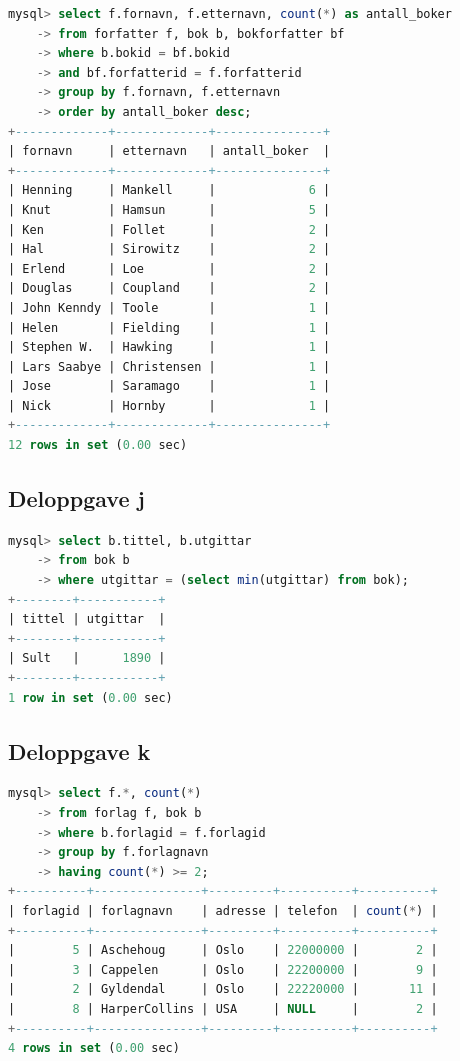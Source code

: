 \documentclass[a4paper, 12pt] {article}
\begin{document}
\begin{lstlisting}[language=SQL, label=oppg3i, caption=Oppgave 3i]
mysql> select f.fornavn, f.etternavn, count(*) as antall_boker
    -> from forfatter f, bok b, bokforfatter bf
    -> where b.bokid = bf.bokid
    -> and bf.forfatterid = f.forfatterid
    -> group by f.fornavn, f.etternavn
    -> order by antall_boker desc;
+-------------+-------------+---------------+
| fornavn     | etternavn   | antall_boker  |
+-------------+-------------+---------------+
| Henning     | Mankell     |             6 |
| Knut        | Hamsun      |             5 |
| Ken         | Follet      |             2 |
| Hal         | Sirowitz    |             2 |
| Erlend      | Loe         |             2 |
| Douglas     | Coupland    |             2 |
| John Kenndy | Toole       |             1 |
| Helen       | Fielding    |             1 |
| Stephen W.  | Hawking     |             1 |
| Lars Saabye | Christensen |             1 |
| Jose        | Saramago    |             1 |
| Nick        | Hornby      |             1 |
+-------------+-------------+---------------+
12 rows in set (0.00 sec)
\end{lstlisting}
\newpage

\subsection{Deloppgave j}

\begin{lstlisting}[language=SQL, label=oppg3j, caption=Oppgave 3j]
mysql> select b.tittel, b.utgittar
    -> from bok b
    -> where utgittar = (select min(utgittar) from bok);
+--------+-----------+
| tittel | utgittar  |
+--------+-----------+
| Sult   |      1890 |
+--------+-----------+
1 row in set (0.00 sec)
\end{lstlisting}

\subsection{Deloppgave k}

\begin{lstlisting}[language=SQL, label=oppg3k, caption=Oppgave 3k]
mysql> select f.*, count(*)
    -> from forlag f, bok b
    -> where b.forlagid = f.forlagid
    -> group by f.forlagnavn
    -> having count(*) >= 2;
+----------+---------------+---------+----------+----------+
| forlagid | forlagnavn    | adresse | telefon  | count(*) |
+----------+---------------+---------+----------+----------+
|        5 | Aschehoug     | Oslo    | 22000000 |        2 |
|        3 | Cappelen      | Oslo    | 22200000 |        9 |
|        2 | Gyldendal     | Oslo    | 22220000 |       11 |
|        8 | HarperCollins | USA     | NULL     |        2 |
+----------+---------------+---------+----------+----------+
4 rows in set (0.00 sec)
\end{lstlisting}
\end{document}
